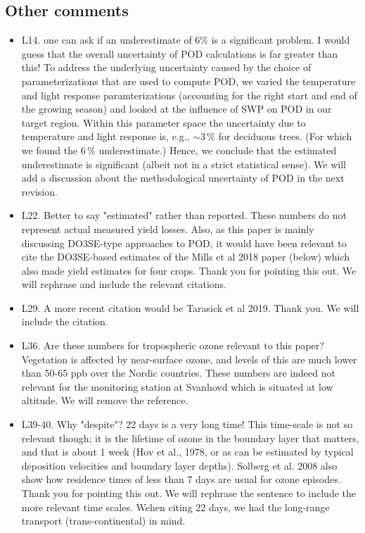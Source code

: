 \documentclass{scrartcl}
\begin{document}
\subsection*{Other comments} 
\begin{itemize}

\item {\color{blue}L14. one can ask if an underestimate of 6\% is a significant problem. I would guess that the overall uncertainty of POD calculations is far greater than this!} To address the underlying uncertainty caused by the choice of parameterizations that are used to compute POD, we varied the temperature and light response paramterizations (accounting for the right start and end of the growing season) and looked at the influence of SWP on POD in our target region. Within this parameter space the uncertainty due to temperature and light response is, e.g., $\sim3\,\%$ for deciduous trees. (For which we found the $6\,\%$ underestimate.) Hence, we conclude that the estimated underestimate is significant (albeit not in a strict statistical sense). We will add a discussion about the methodological uncertainty of POD in the next revision.

\item {\color{blue}L22. Better to say "estimated" rather than reported. These numbers do not represent actual measured yield losses. Also, as this paper is mainly discussing DO3SE-type approaches to POD, it would have been relevant to cite the DO3SE-based estimates of the Mills et al 2018 paper (below) which also made yield estimates for four crops.} Thank you for pointing this out. We will rephrase and include the relevant citations.

\item {\color{blue}L29. A more recent citation would be Tarasick et al 2019.}
Thank you. We will include the citation.

\item {\color{blue}L36. Are these numbers for tropospheric ozone relevant to this paper? Vegetation is affected by near-surface ozone, and levels of this are much lower than 50-65 ppb over the Nordic countries.}
These numbers are indeed not relevant for the monitoring station at Svanhovd which is situated at low altitude. We will remove the reference.

\item {\color{blue}L39-40. Why "despite"? 22 days is a very long time! This time-scale is not so relevant though; it is the lifetime of ozone in the boundary layer that matters, and that is about 1 week (Hov et al., 1978, or as can be estimated by typical deposition velocities and boundary layer depths). Solberg et al. 2008 also show how residence times of less than 7 days are usual for ozone episodes.} Thank you for pointing this out. We will rephrase the sentence to include the more relevant time scales. Wehen citing 22 days, we had the long-range transport (trans-continental) in mind.


\end{itemize}
\end{document}
